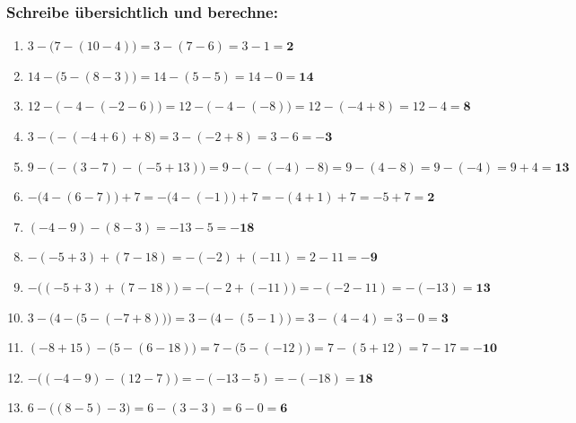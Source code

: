 \documentclass[a4paper,12pt]{article} %
\begin{document}
\subsubsection{Schreibe übersichtlich und berechne:} %

\begin{enumerate}

  \item \(3 - \big( 7 - (10 - 4) \big) = 3 - (7 - 6) = 3 - 1 = \mathbf{2}\) %

  \item \(14 - \big( 5 - (8 - 3) \big) = 14 - (5 - 5) = 14 - 0 = \mathbf{14}\) %

  \item \(12 - \big( -4 - (-2 - 6) \big) = 12 - \big( -4 - (-8) \big) = 12 - (-4 + 8) = 12 - 4 = \mathbf{8}\) %

  \item \(3 - \big( -(-4 + 6) + 8 \big) = 3 - (-2 + 8) = 3 - 6 = \mathbf{-3}\) %

  \item \(9 - \big( -(3 - 7) - (-5 + 13) \big) = 9 - \big( -(-4) - 8 \big) = 9 - (4 - 8) = 9 - (-4) = 9 + 4 = \mathbf{13}\) %

  \item \(- \big( 4 - (6 - 7) \big) + 7 = - \big( 4 - (-1) \big) + 7 = -(4 + 1) + 7 = -5 + 7 = \mathbf{2}\) %

  \item \((-4 - 9) - (8 - 3) = -13 - 5 = \mathbf{-18}\) %

  \item \(-(-5 + 3) + (7 - 18) = -(-2) + (-11) = 2 - 11 = \mathbf{-9}\) %

  \item \(- \big( (-5 + 3) + (7 - 18) \big) = - \big( -2 + (-11) \big) = -(-2 - 11) = -(-13) = \mathbf{13}\) %

  \item \(3 - \Big( 4 - \big( 5 - (-7 + 8) \big) \Big) = 3 - \big( 4 - (5 - 1) \big) = 3 - (4 - 4) = 3 - 0 = \mathbf{3}\) %

  \item \((-8 + 15) - \big( 5 - (6 - 18) \big) = 7 - \big( 5 - (-12) \big) = 7 - (5 + 12) = 7 - 17 = \mathbf{-10}\) %

  \item \(- \big( (-4 - 9) - (12 - 7) \big) = -(-13 - 5) = -(-18) = \mathbf{18}\) %

  \item \(6 - \big( (8 - 5) - 3 \big) = 6 - (3 - 3) = 6 - 0 = \mathbf{6}\) %


\end{enumerate}
\end{document}
